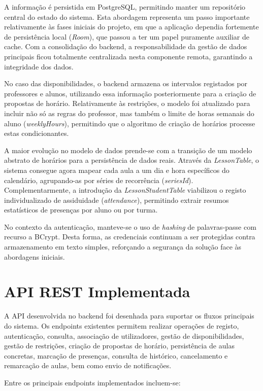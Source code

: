 A informação é persistida em PostgreSQL, permitindo manter um repositório central do estado do sistema. Esta abordagem representa um passo importante relativamente às fases iniciais do projeto, em que a aplicação dependia fortemente de persistência local (\textit{Room}), que passou a ter um papel puramente auxiliar de cache. Com a consolidação do backend, a responsabilidade da gestão de dados principais ficou totalmente centralizada nesta componente remota, garantindo a integridade dos dados.

No caso das disponibilidades, o backend armazena os intervalos registados por professores e alunos, utilizando essa informação posteriormente para a criação de propostas de horário. Relativamente às restrições, o modelo foi atualizado para incluir não só as regras do professor, mas também o limite de horas semanais do aluno (\textit{weeklyHours}), permitindo que o algoritmo de criação de horários processe estas condicionantes.

A maior evolução no modelo de dados prende-se com a transição de um modelo abstrato de horários para a persistência de dados reais. Através da \textit{LessonTable}, o sistema consegue agora mapear cada aula a um dia e hora específicos do calendário, agrupando-as por séries de recorrência (\textit{seriesId}). Complementarmente, a introdução da \textit{LessonStudentTable} viabilizou o registo individualizado de assiduidade (\textit{attendance}), permitindo extrair resumos estatísticos de presenças por aluno ou por turma.

No contexto da autenticação, manteve-se o uso de \textit{hashing} de palavras-passe com recurso a BCrypt. Desta forma, as credenciais continuam a ser protegidas contra armazenamento em texto simples, reforçando a segurança da solução face às abordagens iniciais.


\section{API REST Implementada}

A API desenvolvida no backend foi desenhada para suportar os fluxos principais do sistema. Os endpoints existentes permitem realizar operações de registo, autenticação, consulta, associação de utilizadores, gestão de disponibilidades, gestão de restrições, criação de propostas de horário, persistência de aulas concretas, marcação de presenças, consulta de histórico, cancelamento e remarcação de aulas, bem como envio de notificações.

Entre os principais endpoints implementados incluem-se:

